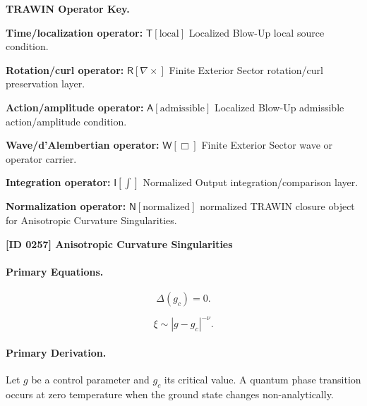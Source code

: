 \par\vspace{0.45\baselineskip}
\noindent\begin{minipage}[t]{\linewidth}
\begingroup
\small
\raggedright
\textbf{TRAWIN Operator Key.}\par
\noindent\textbf{Time/localization operator:} $\mathsf{T}\!\left[\mathrm{local}\right]$ Localized Blow-Up local source condition.\par
\noindent\textbf{Rotation/curl operator:} $\mathsf{R}\!\left[\nabla\times\right]$ Finite Exterior Sector rotation/curl preservation layer.\par
\noindent\textbf{Action/amplitude operator:} $\mathsf{A}\!\left[\mathrm{admissible}\right]$ Localized Blow-Up admissible action/amplitude condition.\par
\noindent\textbf{Wave/d'Alembertian operator:} $\mathsf{W}\!\left[\Box\right]$ Finite Exterior Sector wave or operator carrier.\par
\noindent\textbf{Integration operator:} $\mathsf{I}\!\left[\int\right]$ Normalized Output integration/comparison layer.\par
\noindent\textbf{Normalization operator:} $\mathsf{N}\!\left[\mathrm{normalized}\right]$ normalized TRAWIN closure object for Anisotropic Curvature Singularities.\par
\endgroup
\end{minipage}

\clearpage
\noindent\textbf{[ID 0257] Anisotropic Curvature Singularities}\par
\vspace{0.35em}
\paragraph{Primary Equations.}
\begin{equation}
\Delta(g_c)=0 .
\end{equation}

\begin{equation}
\xi \sim |g-g_c|^{-\nu}.
\end{equation}

\paragraph{Primary Derivation.}
Let $g$ be a control parameter and $g_c$ its critical value.  
A quantum phase transition occurs at zero temperature when the ground state changes non-analytically.

